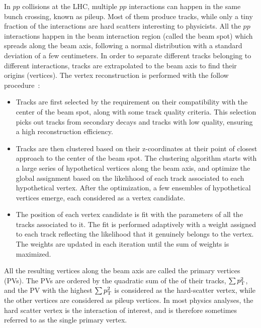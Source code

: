 In $pp$ collisions at the LHC, multiple $pp$ interactions can happen in the same bunch crossing, known as pileup.
Most of them produce tracks, while only a tiny fraction of the interactions are hard scatters interesting to physicists.
All the $pp$ interactions happen in the beam interaction region (called the beam spot) which spreads along the beam axis,
following a normal distribution with a standard deviation of a few centimeters.
In order to separate different tracks belonging to different interactions, 
tracks are extrapolated to the beam axis to find their origins (vertices).
The vertex reconstruction is performed with the follow procedure~\cite{Collaboration_2014}:
\begin{itemize}
\item Tracks are first selected by the requirement on their compatibility with the center of the beam spot, 
      along with some track quality criteria.
      This selection picks out tracks from secondary decays and tracks with low quality, 
      ensuring a high reconstruction efficiency. 
\item Tracks are then clustered based on their z-coordinates at their point of closest approach to the center of the beam spot.
      The clustering algorithm starts with a large series of hypothetical vertices along the beam axis, 
      and optimize the global assignment based on the likelihood of each track associated to each hypothetical vertex.
      After the optimization, a few ensembles of hypothetical vertices emerge, each considered as a vertex candidate.
\item The position of each vertex candidate is fit with the parameters of all the tracks associated to it.
      The fit is performed adaptively with a weight assigned to each track reflecting the likelihood that it genuinely belongs to the vertex.
      The weights are updated in each iteration until the sum of weights is maximized. 
\end{itemize}

All the resulting vertices along the beam axis are called the primary vertices (PVs).
The PVs are ordered by the quadratic sum of the \pt of their tracks, $\sum p_{\mathrm{T}}^{2}$,
and the PV with the highest $\sum p_{\mathrm{T}}^{2}$ is considered as the hard-scatter vertex, 
while the other vertices are considered as pileup vertices.
In most physics analyses, the hard scatter vertex is the interaction of interest,
and is therefore sometimes referred to as the single primary vertex.



